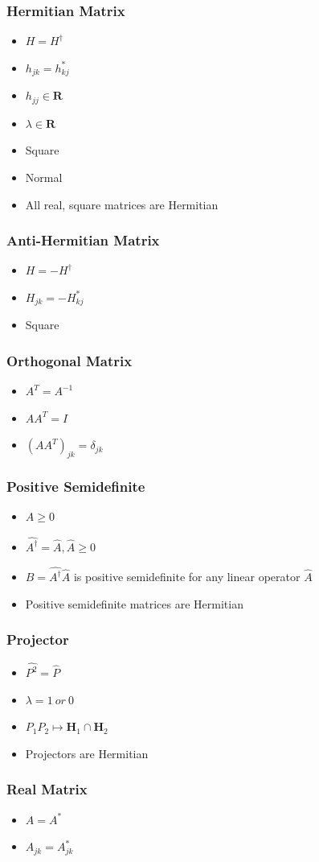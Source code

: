 \documentclass[]{report}
\newcommand \tab[1][1cm]{\hspace*{#1}}
\newcommand{\itemt}{\item \tab}
\begin{document}
\subsubsection{Hermitian Matrix}			
\begin{itemize}
\itemt \( H = H^{\dagger} \)
\itemt \( h_{jk} = h^*_{kj} \)
\itemt \( h_{jj} \in \mathbf{R} \)
\itemt \( \lambda \in \mathbf{R} \)
\itemt Square
\itemt Normal
\itemt All real, square matrices are Hermitian
\end{itemize}

\subsubsection{Anti-Hermitian Matrix}			
\begin{itemize}
\itemt \( H = -H^{\dagger} \)
\itemt \( H_{jk} = -H^*_{kj} \)
\itemt Square
\end{itemize}

\subsubsection{Orthogonal Matrix}			
\begin{itemize}
\itemt \( A^T = A^{-1} \)
\itemt \( AA^T = I \)
\itemt \( (AA^T)_{jk} = \delta_{jk} \)
\end{itemize}			

\subsubsection{Positive Semidefinite}			
\begin{itemize}
\itemt \( A \geq 0 \)
\itemt \( \hat{A^\dagger} = \hat{A}, \hat{A} \geq 0 \)
\itemt \( B = \hat{A^\dagger} \hat{A} \) is positive semidefinite for any linear operator $\hat{A}$
\itemt Positive semidefinite matrices are Hermitian
\end{itemize}				

\subsubsection{Projector}					
\begin{itemize}
\itemt \( \hat{P^2} = \hat{P} \)
\itemt \( \lambda = 1\ or\ 0 \)
\itemt \( P_1P_2 \mapsto \mathbf{H}_1 \cap \mathbf{H}_2 \)
\itemt Projectors are Hermitian
\end{itemize}			

\subsubsection{Real Matrix}				
\begin{itemize}
\itemt \( A=A^* \)
\itemt \( A_{jk} = A^*_{jk} \)
\end{itemize}				
\end{document}
